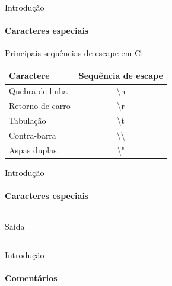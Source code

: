 \documentclass{beamer}
\begin{document}
\begin{frame}{Introdução}
	\framesubtitle{Caracteres especiais}
	Principais sequências de escape em C:
	\begin{table}[!b]
	 {\carlitoTLF
	 \begin{tabularx}{\textwidth}{Xc}
	   \textbf{Caractere} & \textbf{Sequência de escape} \\
	   \toprule
	   Quebra de linha       & \textbackslash n \\
	   Retorno de carro      & \textbackslash r \\
	   Tabulação             & \textbackslash t \\
	   Contra-barra          & \textbackslash \textbackslash \\
	   Aspas duplas          &\textbackslash "  \\
	   \bottomrule
	 \end{tabularx}}
	\end{table}
\end{frame}
\begin{frame}[fragile]{Introdução}
	\framesubtitle{Caracteres especiais}
	\inputminted{c}{resources/escapes.c}
	\begin{block}{Saída}
		\inputminted{text}{resources/escapesout.txt}
	\end{block}
\end{frame}
\begin{frame}[fragile]{Introdução}
	\framesubtitle{Comentários}
\end{frame}
\end{document}
